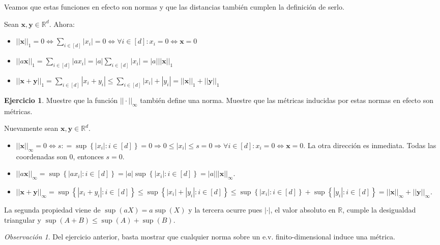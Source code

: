 \documentclass[12pt]{article}
\theoremstyle{plain}
\theoremstyle{definition}
\newtheorem{Ej}[Th]{Ejercicio}
\theoremstyle{remark}
\newtheorem{Rmk}[Th]{Observación}      %
\numberwithin{equation}{section}
\newcommand{\bR}{\mathbb{R}}        %
\renewcommand{\leq}{\leqslant}      %
\renewcommand{\:}{\colon}           %
\renewcommand{\vec}[1]{\mathbf{#1}}
\newcommand{\vx}{\vec{x}}           %
\newcommand{\vy}{\vec{y}}
\newcommand{\conj}[1]{\left\lbrace#1\right\rbrace}
\newcommand{\bonj}[1]{\left\lbrack#1\right\rbrack}
\begin{document}
\begin{multicols}{2}
Veamos que estas funciones en efecto son normas y que las distancias también cumplen la definición de serlo.
\begin{ptcbp}
Sean $\vx,\vy\in\bR^d$. Ahora:
\begin{itemize}
  \item $||\vx||_1=0\iff \sum_{i\in\bonj{d}}|x_i|=0 \iff \forall i\in\bonj{d}\colon x_i=0 \iff \vx=0$
  \item $||a\vx||_1=\sum_{i\in\bonj{d}}|ax_i|=|a|\sum_{i\in\bonj{d}}|x_i|=|a|||\vx||_1$
  \item $||\vx+\vy||_1=\sum_{i\in\bonj{d}}|x_i+y_i|\leq\sum_{i\in\bonj{d}}|x_i|+|y_i|=||\vx||_1+||\vy||_1$
\end{itemize}


\end{ptcbp}

\begin{Ej}
  Muestre que la función $||\cdot||_\infty$ también define una norma. Muestre que las métricas inducidas por estas normas en efecto son métricas.
\end{Ej}

\begin{ptcb}
Nuevamente sean $\vx,\vy\in\bR^d$.
\begin{itemize}
  \item $||\vx||_\infty = 0\iff s\colon=\sup\conj{|x_i|\colon i\in\bonj{d}}=0\Rightarrow 0\leq|x_i|\leq s =0\Rightarrow \forall i\in\bonj{d}\colon x_i=0 \iff \vx=0 $. La otra dirección es inmediata. Todas las coordenadas son 0, entonces $s=0$.
  \item $||a\vx||_\infty=\sup\conj{|ax_i|\colon i\in\bonj{d}}=|a|\sup\conj{|x_i|\colon i\in\bonj{d}}=|a|||\vx||_\infty$.
  \item $||\vx+\vy||_\infty=\sup\conj{|x_i+y_i|\colon i\in\bonj{d}}\leq\sup\conj{|x_i|+|y_i|\colon i\in\bonj{d}}\leq\sup\conj{|x_i|\colon i\in\bonj{d}}+\sup\conj{|y_i|\colon i\in\bonj{d}}=||\vx||_\infty+||\vy||_\infty$.
\end{itemize}
La segunda propiedad viene de $\sup(aX)=a\sup(X)$ y la tercera ocurre pues $|\cdot|$, el valor absoluto en $\bR$, cumple la desigualdad triangular y $\sup(A+B)\leq\sup(A)+\sup(B)$.
\end{ptcb}


\begin{Rmk}
  Del ejercicio anterior, basta mostrar que cualquier norma sobre un e.v. finito-dimensional induce una métrica.
\end{Rmk}


\end{multicols}
\end{document}
